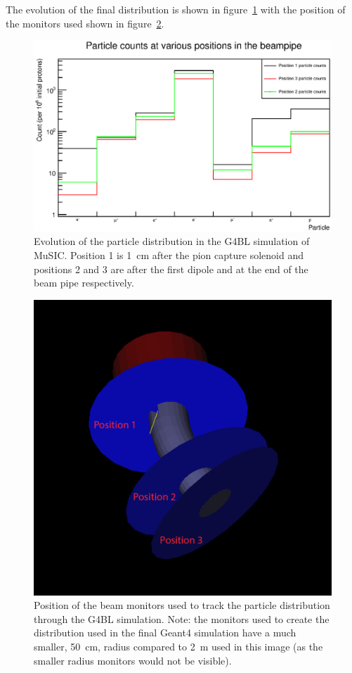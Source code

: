 The evolution of the final distribution is shown in figure~\ref{fig:images_pid_counts_in_beamline} with the position of the monitors used shown in figure~\ref{fig:images_g4bl_monitor_locations_bigger_edit}. 
\begin{figure}[hptb]
  \centering
    \includegraphics[width=.9\textwidth]{images/pid_counts_in_beamline.eps}
  \caption{Evolution of the particle distribution in the G4BL simulation of MuSIC. Position 1 is 1~cm after the pion capture solenoid and positions 2 and 3 are after the first dipole and at the end of the beam pipe respectively.}
  \label{fig:images_pid_counts_in_beamline}
\end{figure}
\begin{figure}[hptb]
  \centering
    \includegraphics[width=.9\textwidth]{images/g4bl_monitor_locations_bigger_edit.png}
  \caption{Position of the beam monitors used to track the particle distribution through the G4BL simulation. Note: the monitors used to create the distribution used in the final Geant4 simulation have a much smaller, 50~cm, radius compared to 2~m used in this image (as the smaller radius monitors would not be visible).}
  \label{fig:images_g4bl_monitor_locations_bigger_edit}
\end{figure}

